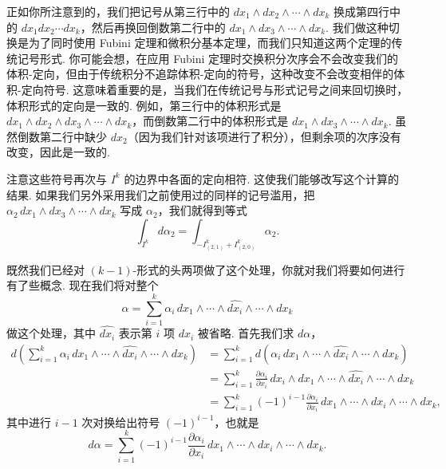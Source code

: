 正如你所注意到的，我们把记号从第三行中的 $dx_1\wedge dx_2\wedge\cdots\wedge dx_k$ 换成第四行中的 $dx_1dx_2\cdots dx_k$，然后再换回倒数第二行中的 $dx_1\wedge dx_3\wedge\cdots\wedge dx_k$. 我们做这种切换是为了同时使用 Fubini 定理和微积分基本定理，而我们只知道这两个定理的传统记号形式. 你可能会想，在应用 Fubini 定理时交换积分次序会不会改变我们的体积-定向，但由于传统积分不追踪体积-定向的符号，这种改变不会改变相伴的体积-定向符号. 这意味着重要的是，当我们在传统记号与形式记号之间来回切换时，体积形式的定向是一致的. 例如，第三行中的体积形式是 $dx_1\wedge dx_2\wedge dx_3\wedge\cdots\wedge dx_k$，而倒数第二行中的体积形式是 $dx_1\wedge dx_3\wedge\cdots\wedge dx_k$. 虽然倒数第二行中缺少 $dx_2$（因为我们针对该项进行了积分），但剩余项的次序没有改变，因此是一致的.

注意这些符号再次与 $I^k$ 的边界中各面的定向相符. 这使我们能够改写这个计算的结果. 如果我们另外采用我们之前使用过的同样的记号滥用，把 $\alpha_2\,dx_1\wedge dx_3\wedge\cdots\wedge dx_k$ 写成 $\alpha_2$，我们就得到等式
\[
\int_{I^k}d\alpha_2=\int_{-I^k_{(2,1)}+I^k_{(2,0)}}\alpha_2.
\]

既然我们已经对 $(k-1)$-形式的头两项做了这个处理，你就对我们将要如何进行有了些概念. 现在我们将对整个
\[
\alpha=\sum_{i=1}^{k}\alpha_i\,dx_1\wedge\cdots\wedge\widehat{dx_i}\wedge\cdots\wedge dx_k
\]
做这个处理，其中 $\widehat{dx_i}$ 表示第 $i$ 项 $dx_i$ 被省略. 首先我们求 $d\alpha$，
\[
\begin{aligned}
d\left(\sum_{i=1}^{k}\alpha_i\,dx_1\wedge\cdots\wedge\widehat{dx_i}\wedge\cdots\wedge dx_k\right)
&=\sum_{i=1}^{k}d\left(\alpha_i\,dx_1\wedge\cdots\wedge\widehat{dx_i}\wedge\cdots\wedge dx_k\right)\\
&=\sum_{i=1}^{k}\frac{\partial\alpha_i}{\partial x_i}\,dx_i\wedge dx_1\wedge\cdots\wedge\widehat{dx_i}\wedge\cdots\wedge dx_k\\
&=\sum_{i=1}^{k}(-1)^{i-1}\frac{\partial\alpha_i}{\partial x_i}\,dx_1\wedge\cdots\wedge dx_i\wedge\cdots\wedge dx_k,
\end{aligned}
\]
其中进行 $i-1$ 次对换给出符号 $(-1)^{i-1}$，也就是
\[
d\alpha=\sum_{i=1}^{k}(-1)^{i-1}\frac{\partial\alpha_i}{\partial x_i}\,dx_1\wedge\cdots\wedge dx_i\wedge\cdots\wedge dx_k.
\]

